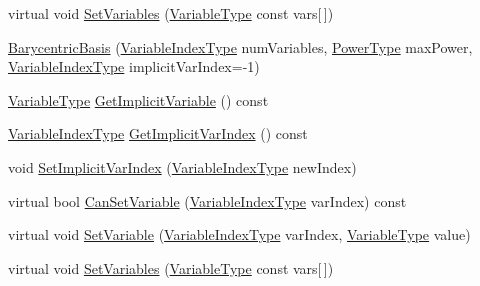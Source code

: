 \begin{DoxyCompactItemize}
\item 
virtual void \hyperlink{classnmr_multi_variable_power_basis_ab454425aeefbf2d7afd741ca6dcb38cb}{Set\-Variables} (\hyperlink{classnmr_multi_variable_power_basis_a7089007a79cce8d2eb3672e2d61af06c}{Variable\-Type} const vars\mbox{[}$\,$\mbox{]})
\item 
\hyperlink{classnmr_multi_variable_power_basis_ae41a070cd143003217f557cb0fce175f}{Barycentric\-Basis} (\hyperlink{classnmr_multi_variable_power_basis_ae125326a623043fcfd020aeeefd1cce6}{Variable\-Index\-Type} num\-Variables, \hyperlink{classnmr_multi_variable_power_basis_a2cb67df83e9fcac213848fa7a7295fcc}{Power\-Type} max\-Power, \hyperlink{classnmr_multi_variable_power_basis_ae125326a623043fcfd020aeeefd1cce6}{Variable\-Index\-Type} implicit\-Var\-Index=-\/1)
\item 
\hyperlink{classnmr_multi_variable_power_basis_a7089007a79cce8d2eb3672e2d61af06c}{Variable\-Type} \hyperlink{classnmr_multi_variable_power_basis_a10bb68fd02aefa61c187151b741a5ae7}{Get\-Implicit\-Variable} () const 
\item 
\hyperlink{classnmr_multi_variable_power_basis_ae125326a623043fcfd020aeeefd1cce6}{Variable\-Index\-Type} \hyperlink{classnmr_multi_variable_power_basis_af19d614590b843a7ce1f4355be4174bd}{Get\-Implicit\-Var\-Index} () const 
\item 
void \hyperlink{classnmr_multi_variable_power_basis_ac08437f297d3deb0d7bbb6500b06779d}{Set\-Implicit\-Var\-Index} (\hyperlink{classnmr_multi_variable_power_basis_ae125326a623043fcfd020aeeefd1cce6}{Variable\-Index\-Type} new\-Index)
\item 
virtual bool \hyperlink{classnmr_multi_variable_power_basis_abcaeac7c3a176d67ff36be3cabd12de1}{Can\-Set\-Variable} (\hyperlink{classnmr_multi_variable_power_basis_ae125326a623043fcfd020aeeefd1cce6}{Variable\-Index\-Type} var\-Index) const 
\item 
virtual void \hyperlink{classnmr_multi_variable_power_basis_a9e01a0a65e51201f44851c34a68fdd59}{Set\-Variable} (\hyperlink{classnmr_multi_variable_power_basis_ae125326a623043fcfd020aeeefd1cce6}{Variable\-Index\-Type} var\-Index, \hyperlink{classnmr_multi_variable_power_basis_a7089007a79cce8d2eb3672e2d61af06c}{Variable\-Type} value)
\item 
virtual void \hyperlink{classnmr_multi_variable_power_basis_ab454425aeefbf2d7afd741ca6dcb38cb}{Set\-Variables} (\hyperlink{classnmr_multi_variable_power_basis_a7089007a79cce8d2eb3672e2d61af06c}{Variable\-Type} const vars\mbox{[}$\,$\mbox{]})
\end{DoxyCompactItemize}
